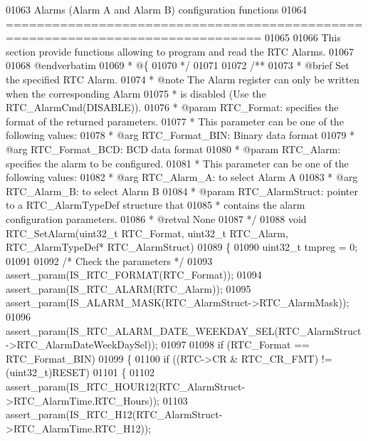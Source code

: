 \begin{DoxyCode}
01063 \textcolor{comment}{              Alarms (Alarm A and Alarm B) configuration functions}
01064 \textcolor{comment}{ ===============================================================================  }
01065 \textcolor{comment}{}
01066 \textcolor{comment}{  This section provide functions allowing to program and read the RTC Alarms.}
01067 \textcolor{comment}{}
01068 \textcolor{comment}{@endverbatim}
01069 \textcolor{comment}{  * @\{}
01070 \textcolor{comment}{  */}
01071 
01072 \textcolor{comment}{/**}
01073 \textcolor{comment}{  * @brief  Set the specified RTC Alarm.}
01074 \textcolor{comment}{  * @note   The Alarm register can only be written when the corresponding Alarm}
01075 \textcolor{comment}{  *         is disabled (Use the RTC\_AlarmCmd(DISABLE)).    }
01076 \textcolor{comment}{  * @param  RTC\_Format: specifies the format of the returned parameters.}
01077 \textcolor{comment}{  *          This parameter can be one of the following values:}
01078 \textcolor{comment}{  *            @arg RTC\_Format\_BIN: Binary data format }
01079 \textcolor{comment}{  *            @arg RTC\_Format\_BCD: BCD data format}
01080 \textcolor{comment}{  * @param  RTC\_Alarm: specifies the alarm to be configured.}
01081 \textcolor{comment}{  *          This parameter can be one of the following values:}
01082 \textcolor{comment}{  *            @arg RTC\_Alarm\_A: to select Alarm A}
01083 \textcolor{comment}{  *            @arg RTC\_Alarm\_B: to select Alarm B  }
01084 \textcolor{comment}{  * @param  RTC\_AlarmStruct: pointer to a RTC\_AlarmTypeDef structure that }
01085 \textcolor{comment}{  *                          contains the alarm configuration parameters.     }
01086 \textcolor{comment}{  * @retval None}
01087 \textcolor{comment}{  */}
01088 \textcolor{keywordtype}{void} RTC_SetAlarm(uint32\_t RTC\_Format, uint32\_t RTC\_Alarm, RTC\_AlarmTypeDef* RTC\_AlarmStruct)
01089 \{
01090   uint32\_t tmpreg = 0;
01091 
01092   \textcolor{comment}{/* Check the parameters */}
01093   assert_param(IS\_RTC\_FORMAT(RTC\_Format));
01094   assert_param(IS\_RTC\_ALARM(RTC\_Alarm));
01095   assert_param(IS\_ALARM\_MASK(RTC\_AlarmStruct->RTC\_AlarmMask));
01096   assert_param(IS\_RTC\_ALARM\_DATE\_WEEKDAY\_SEL(RTC\_AlarmStruct->RTC\_AlarmDateWeekDaySel));
01097 
01098   \textcolor{keywordflow}{if} (RTC\_Format == RTC_Format_BIN)
01099   \{
01100     \textcolor{keywordflow}{if} ((RTC->CR & RTC_CR_FMT) != (uint32\_t)RESET)
01101     \{
01102       assert_param(IS\_RTC\_HOUR12(RTC\_AlarmStruct->RTC\_AlarmTime.RTC\_Hours));
01103       assert_param(IS\_RTC\_H12(RTC\_AlarmStruct->RTC\_AlarmTime.RTC\_H12));

\end{DoxyCode}
